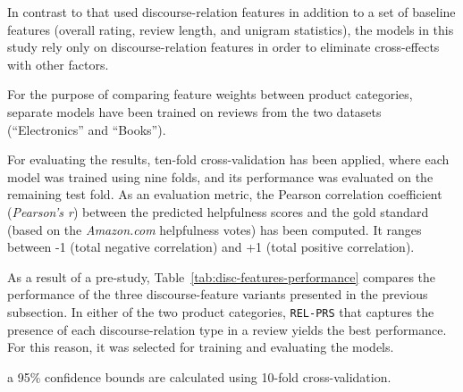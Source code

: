 \documentclass[
    a4paper,%
    12pt,%
    oneside,%
    toc=bibliography,
    final,
]{scrartcl}
\begin{document}
In contrast to \citet{Golly2017} that used discourse-relation features in addition to a set of baseline features (overall rating, review length, and unigram statistics), the models in this study rely only on discourse-relation features in order to eliminate cross-effects with other factors.

For the purpose of comparing feature weights between product categories, separate models have been trained on reviews from the two datasets (“Electronics” and “Books”).

For evaluating the results, ten-fold cross-validation has been applied, where each model was trained using nine folds, and its performance was evaluated on the remaining test fold. As an evaluation metric, the Pearson correlation coefficient (\textit{Pearson's r}) between the predicted helpfulness scores and the gold standard (based on the \textit{Amazon.com} helpfulness votes) has been computed. It ranges between -1 (total negative correlation) and +1 (total positive correlation).

As a result of a pre-study, Table~\ref{tab:disc-features-performance} compares the performance of the three discourse-feature variants presented in the previous subsection. In either of the two product categories, \lstinline|REL-PRS| that captures the presence of each discourse-relation type in a review yields the best performance. For this reason, it was selected for training and evaluating the models.

\begin{table}[h!]
	\centering
	
	\caption{Evaluation results of a linear SVR model using different variants of discourse-relation features}
	\label{tab:disc-features-performance}
	
	\begin{threeparttable}
	\renewcommand{\arraystretch}{1.5}
	
	\begin{tablenotes}
	\centering
	\footnotesize
	\item[a] 95\% confidence bounds are calculated using 10-fold cross-validation.
	\end{tablenotes}
	
	\end{threeparttable}

\end{table}
\end{document}
